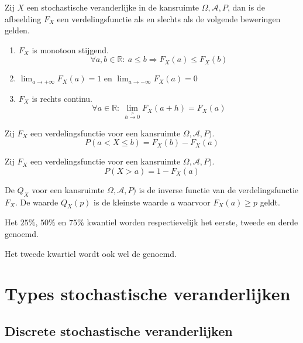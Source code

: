 \documentclass[main.tex]{subfiles}
\begin{document}
\begin{st}
  Zij $X$ een stochastische veranderlijke in de kansruimte $\Omega,\mathcal{A},P$, dan is de afbeelding $F_{X}$ een verdelingsfunctie als en slechts als de volgende beweringen gelden.
  \begin{enumerate}
  \item $F_{X}$ is monotoon stijgend.
    \[ \forall a,b\in \mathbb{R}:\ a\le b \Rightarrow F_{X}(a) \le F_{X}(b) \]
  \item $\lim_{a\rightarrow +\infty}F_{X}(a) = 1$ en $\lim_{a \rightarrow -\infty}F_{X}(a) = 0$
  \item $F_{X}$ is rechts continu.
    \[ \forall a\in\mathbb{R}:\ \lim_{h \overset{>}{\rightarrow} 0}F_{X}(a+h) = F_{X}(a) \]
  \end{enumerate}
\zb
\end{st}

\begin{st}
  Zij $F_{X}$ een verdelingsfunctie voor een kansruimte $\Omega,\mathcal{A},P)$.
  \[ P(a < X \le b) = F_{X}(b) - F_{X}(a) \]
\end{st}


\begin{st}
  Zij $F_{X}$ een verdelingsfunctie voor een kansruimte $\Omega,\mathcal{A},P)$.
  \[ P(X > a) = 1-F_{X}(a) \]
\end{st}

\begin{de}
  De  $Q_{X}$ voor een kansruimte $\Omega,\mathcal{A},P)$ is de inverse functie van de verdelingsfunctie $F_{X}$.
  De waarde $Q_{X}(p)$ is de kleinste waarde $a$ waarvoor $F_{X}(a) \ge p$ geldt.
\end{de}

\begin{de}
  Het $25\%$, $50\%$ en $75\%$ kwantiel worden respectievelijk het eerste, tweede en derde  genoemd.
\end{de}

\begin{de}
  Het tweede kwartiel wordt ook wel de  genoemd.
\end{de}

\section{Types stochastische veranderlijken}
\label{sec:types-stoch-verand}

\subsection{Discrete stochastische veranderlijken}
\label{sec:discr-stoch-verand}
\end{document}
